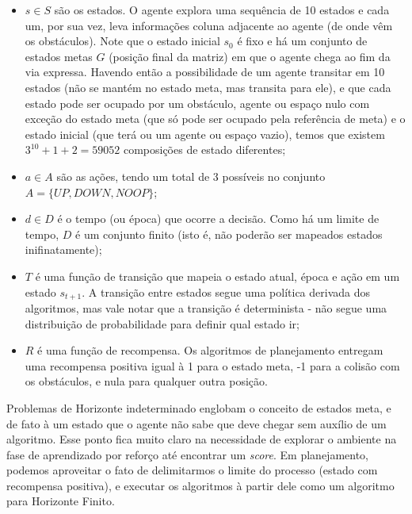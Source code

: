\documentclass[letterpaper]{article} %
\begin{document}
\begin{itemize}

\item $s \in S$ são os estados. O agente explora uma sequência de 10 estados e cada um, por sua vez, leva informações coluna adjacente ao agente (de onde vêm os obstáculos). Note que o estado inicial $s_0$ é fixo e há um conjunto de estados metas $G$ (posição final da matriz) em que o agente chega ao fim da via expressa. Havendo então a possibilidade de um agente transitar em 10 estados (não se mantém no estado meta, mas transita para ele), e que cada estado pode ser ocupado por um obstáculo, agente ou espaço nulo com exceção do estado meta (que só pode ser ocupado pela referência de meta) e o estado inicial (que terá ou um agente ou espaço vazio), temos que existem $3^{10} + 1 + 2 = 59052$ composições de estado diferentes;

\item $a \in A$ são as ações, tendo um total de 3 possíveis no conjunto  $A = \{UP, DOWN, NOOP\}$;

\item $d \in D$ é o tempo (ou época) que ocorre a decisão. Como há um limite de tempo, $D$ é um conjunto finito (isto é, não poderão ser mapeados estados inifinatamente);

\item $T$ é uma função de transição que mapeia o estado atual, época e ação em um estado $s_{t+1}$. A transição entre estados segue uma política derivada dos algoritmos, mas vale notar que a transição é determinista - não segue uma distribuição de probabilidade para definir qual estado ir;

\item $R$ é uma função de recompensa. Os algoritmos de planejamento entregam uma recompensa positiva igual à 1 para o estado meta, -1 para a colisão com os obstáculos, e nula para qualquer outra posição.

\end{itemize}

Problemas de Horizonte indeterminado englobam o conceito de estados meta, e de fato à um estado que o agente não sabe que deve chegar sem auxílio de um algoritmo. Esse ponto fica muito claro na necessidade de explorar o ambiente na fase de aprendizado por reforço até encontrar um \textit{score}. Em planejamento, podemos aproveitar o fato de delimitarmos o limite do processo (estado com recompensa positiva), e executar os algoritmos à partir dele como um algoritmo para Horizonte Finito.
\end{document}
